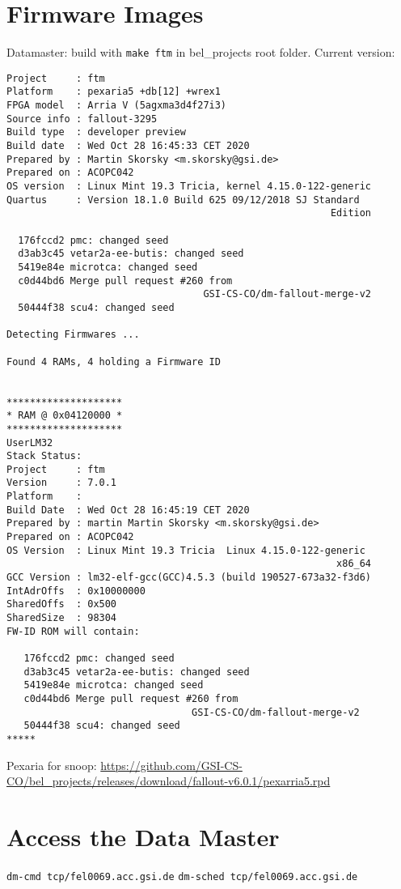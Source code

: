 \documentclass[12pt,a4paper]{report}
\begin{document}
\section{Firmware Images}
Datamaster: build with \texttt{make ftm} in bel\_projects root folder. Current version:
\begin{verbatim}
Project     : ftm
Platform    : pexaria5 +db[12] +wrex1
FPGA model  : Arria V (5agxma3d4f27i3)
Source info : fallout-3295
Build type  : developer preview
Build date  : Wed Oct 28 16:45:33 CET 2020
Prepared by : Martin Skorsky <m.skorsky@gsi.de>
Prepared on : ACOPC042
OS version  : Linux Mint 19.3 Tricia, kernel 4.15.0-122-generic
Quartus     : Version 18.1.0 Build 625 09/12/2018 SJ Standard
                                                        Edition

  176fccd2 pmc: changed seed
  d3ab3c45 vetar2a-ee-butis: changed seed
  5419e84e microtca: changed seed
  c0d44bd6 Merge pull request #260 from
                                  GSI-CS-CO/dm-fallout-merge-v2
  50444f38 scu4: changed seed

Detecting Firmwares ...

Found 4 RAMs, 4 holding a Firmware ID


********************
* RAM @ 0x04120000 *
********************
UserLM32
Stack Status:
Project     : ftm
Version     : 7.0.1
Platform    :
Build Date  : Wed Oct 28 16:45:19 CET 2020
Prepared by : martin Martin Skorsky <m.skorsky@gsi.de>
Prepared on : ACOPC042
OS Version  : Linux Mint 19.3 Tricia  Linux 4.15.0-122-generic
                                                         x86_64
GCC Version : lm32-elf-gcc(GCC)4.5.3 (build 190527-673a32-f3d6)
IntAdrOffs  : 0x10000000
SharedOffs  : 0x500
SharedSize  : 98304
FW-ID ROM will contain:

   176fccd2 pmc: changed seed
   d3ab3c45 vetar2a-ee-butis: changed seed
   5419e84e microtca: changed seed
   c0d44bd6 Merge pull request #260 from
                                GSI-CS-CO/dm-fallout-merge-v2
   50444f38 scu4: changed seed
*****
\end{verbatim}

Pexaria for snoop: \url{https://github.com/GSI-CS-CO/bel\_projects/releases/download/fallout-v6.0.1/pexarria5.rpd}

\section{Access the Data Master}
\texttt{dm-cmd tcp/fel0069.acc.gsi.de}
\linebreak
\texttt{dm-sched tcp/fel0069.acc.gsi.de}
\end{document}
